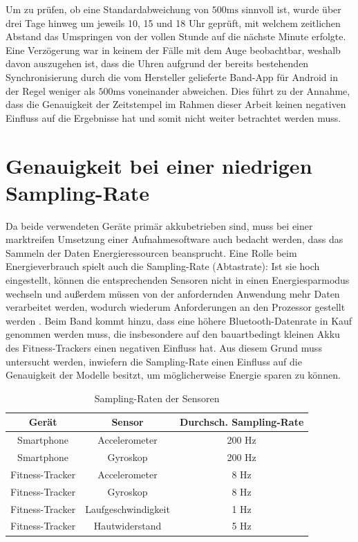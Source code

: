 Um zu prüfen, ob eine Standardabweichung von $500 \text{ms}$ sinnvoll ist, wurde über drei Tage hinweg um jeweils 10, 15 und 18 Uhr geprüft, mit welchem zeitlichen Abstand das Umspringen von der vollen Stunde auf die nächste Minute erfolgte. Eine Verzögerung war in keinem der Fälle mit dem Auge beobachtbar, weshalb davon auszugehen ist, dass die Uhren aufgrund der bereits bestehenden Synchronisierung durch die vom Hersteller gelieferte Band-App für Android in der Regel weniger als $500 \text{ms}$ voneinander abweichen. Dies führt zu der Annahme, dass die Genauigkeit der Zeitstempel im Rahmen dieser Arbeit keinen negativen Einfluss auf die Ergebnisse hat und somit nicht weiter betrachtet werden muss.

\section{Genauigkeit bei einer niedrigen Sampling-Rate}
\label{sec:lower-sampling-rate}

Da beide verwendeten Geräte primär akkubetrieben sind, muss bei einer marktreifen Umsetzung einer Aufnahmesoftware auch bedacht werden, dass das Sammeln der Daten Energieressourcen beansprucht. Eine Rolle beim Energieverbrauch spielt auch die Sampling-Rate (Abtastrate): Ist sie hoch eingestellt, können die entsprechenden Sensoren nicht in einen Energiesparmodus wechseln und außerdem müssen von der anfordernden Anwendung mehr Daten verarbeitet werden, wodurch wiederum Anforderungen an den Prozessor gestellt werden \cite{Krause2005}. Beim Band kommt hinzu, dass eine höhere Bluetooth-Datenrate in Kauf genommen werden muss, die insbesondere auf den bauartbedingt kleinen Akku des Fitness-Trackers einen negativen Einfluss hat. Aus diesem Grund muss untersucht werden, inwiefern die Sampling-Rate einen Einfluss auf die Genauigkeit der Modelle besitzt, um möglicherweise Energie sparen zu können.

\begin{table}[h]
	\centering
	\begin{tabular}{|c|c|c|}
		\hline 
		\textbf{Gerät} & \textbf{Sensor} & \textbf{Durchsch. Sampling-Rate} \\ 
		\hline 
		Smartphone & Accelerometer & 200 Hz \\ 
		\hline 
		Smartphone & Gyroskop & 200 Hz \\ 
		\hline 
		Fitness-Tracker & Accelerometer & 8 Hz \\ 
		\hline 
		Fitness-Tracker & Gyroskop & 8 Hz \\ 
		\hline 
		Fitness-Tracker & Laufgeschwindigkeit & 1 Hz \\ 
		\hline 
		Fitness-Tracker & Hautwiderstand & 5 Hz \\ 
		\hline 
	\end{tabular}
	\caption{Sampling-Raten der Sensoren}
	\label{tab:sampling-rates}
\end{table}

